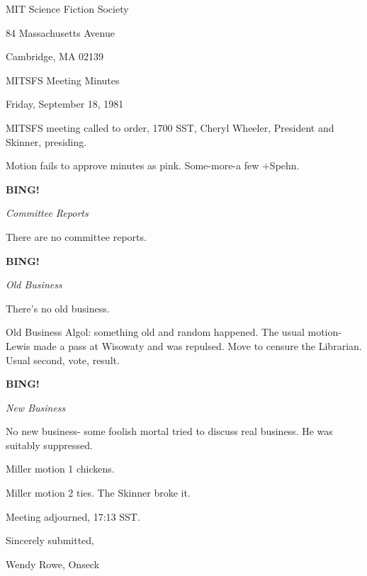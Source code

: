 \documentclass[12pt]{article}
\newcommand{\bing}{{\bf BING!} }
\newcommand{\goto}[1]{\bing \vskip 12pt \centerline{{\em{#1}}}}
\begin{document}
\begin{center}

MIT Science Fiction Society 

84 Massachusetts Avenue

Cambridge, MA 02139

\vspace{12pt}

MITSFS Meeting Minutes 

Friday, September 18, 1981

\end{center}
 
\vspace{18pt}

\setlength{\parskip}{6pt}

\noindent
MITSFS meeting called to order, 1700 SST,
Cheryl Wheeler, President and Skinner, presiding.

Motion fails to approve minutes as pink. Some-more-a few +Spehn.

\goto{Committee Reports}

There are no committee reports.

\goto{Old Business}

There's no old business.

Old Business Algol: something old and random happened. The usual motion- Lewis made a pass at Wisowaty and was repulsed. Move to censure the Librarian. Usual second, vote, result.

\goto{New Business}

No new business- some foolish mortal tried to discuss real business. He was suitably suppressed.

Miller motion 1 chickens.

Miller motion 2 ties. The Skinner broke it.

\vspace{12pt}

\noindent
Meeting adjourned, 17:13 SST.

\vspace{18pt}

\centerline{Sincerely submitted,}
\centerline{Wendy Rowe, Onseck}
\end{document}
